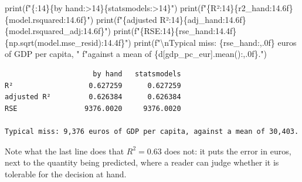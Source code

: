 \documentclass[
  letterpaper,
  10pt,
  twoside,
  openright,
  numbers=noenddot,
  chapterprefix=true]{scrbook}
\newenvironment{Shaded}{}{}
\newcommand{\BuiltInTok}[1]{\textcolor[rgb]{0.84,0.23,0.29}{#1}}
\newcommand{\CharTok}[1]{\textcolor[rgb]{0.01,0.18,0.38}{#1}}
\newcommand{\NormalTok}[1]{\textcolor[rgb]{0.14,0.16,0.18}{#1}}
\newcommand{\SpecialCharTok}[1]{\textcolor[rgb]{0.00,0.36,0.77}{#1}}
\newcommand{\SpecialStringTok}[1]{\textcolor[rgb]{0.01,0.18,0.38}{#1}}
\newcommand{\StringTok}[1]{\textcolor[rgb]{0.01,0.18,0.38}{#1}}
\begin{document}
\begin{Shaded}
\begin{Highlighting}[]
\BuiltInTok{print}\NormalTok{(}\SpecialStringTok{f"}\SpecialCharTok{\{}\StringTok{\textquotesingle{}\textquotesingle{}}\SpecialCharTok{:14\}\{}\StringTok{\textquotesingle{}by hand\textquotesingle{}}\SpecialCharTok{:\textgreater{}14\}\{}\StringTok{\textquotesingle{}statsmodels\textquotesingle{}}\SpecialCharTok{:\textgreater{}14\}}\SpecialStringTok{"}\NormalTok{)}
\BuiltInTok{print}\NormalTok{(}\SpecialStringTok{f"}\SpecialCharTok{\{}\StringTok{\textquotesingle{}R²\textquotesingle{}}\SpecialCharTok{:14\}\{}\NormalTok{r2\_hand}\SpecialCharTok{:14.6f\}\{}\NormalTok{model}\SpecialCharTok{.}\NormalTok{rsquared}\SpecialCharTok{:14.6f\}}\SpecialStringTok{"}\NormalTok{)}
\BuiltInTok{print}\NormalTok{(}\SpecialStringTok{f"}\SpecialCharTok{\{}\StringTok{\textquotesingle{}adjusted R²\textquotesingle{}}\SpecialCharTok{:14\}\{}\NormalTok{adj\_hand}\SpecialCharTok{:14.6f\}\{}\NormalTok{model}\SpecialCharTok{.}\NormalTok{rsquared\_adj}\SpecialCharTok{:14.6f\}}\SpecialStringTok{"}\NormalTok{)}
\BuiltInTok{print}\NormalTok{(}\SpecialStringTok{f"}\SpecialCharTok{\{}\StringTok{\textquotesingle{}RSE\textquotesingle{}}\SpecialCharTok{:14\}\{}\NormalTok{rse\_hand}\SpecialCharTok{:14.4f\}\{}\NormalTok{np}\SpecialCharTok{.}\NormalTok{sqrt(model.mse\_resid)}\SpecialCharTok{:14.4f\}}\SpecialStringTok{"}\NormalTok{)}
\BuiltInTok{print}\NormalTok{(}\SpecialStringTok{f"}\CharTok{\textbackslash{}n}\SpecialStringTok{Typical miss: }\SpecialCharTok{\{}\NormalTok{rse\_hand}\SpecialCharTok{:,.0f\}}\SpecialStringTok{ euros of GDP per capita, "}
      \SpecialStringTok{f"against a mean of }\SpecialCharTok{\{}\NormalTok{d[}\StringTok{\textquotesingle{}gdp\_pc\_eur\textquotesingle{}}\NormalTok{]}\SpecialCharTok{.}\NormalTok{mean()}\SpecialCharTok{:,.0f\}}\SpecialStringTok{."}\NormalTok{)}
\end{Highlighting}
\end{Shaded}

\begin{verbatim}
                     by hand   statsmodels
R²                  0.627259      0.627259
adjusted R²         0.626384      0.626384
RSE                9376.0020     9376.0020

Typical miss: 9,376 euros of GDP per capita, against a mean of 30,403.
\end{verbatim}

Note what the last line does that \(R^2 = 0.63\) does not: it puts the
error in euros, next to the quantity being predicted, where a reader can
judge whether it is tolerable for the decision at hand.
\end{document}
